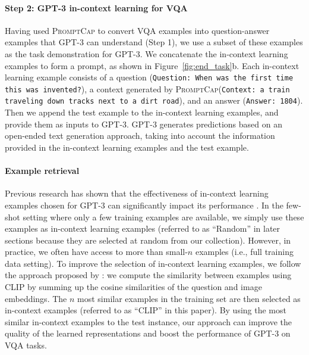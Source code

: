 \documentclass[10pt,twocolumn,letterpaper]{article}
\newcommand{\NAME}{\textsc{PromptCap}\xspace}
\begin{document}
\paragraph{Step 2: GPT-3 in-context learning for VQA}
Having used \NAME to convert VQA examples into question-answer examples that GPT-3 can understand (Step 1), 
we use a subset of these examples as the task demonstration for GPT-3. We concatenate the in-context learning examples to form a prompt, as shown in Figure~\ref{fig:end_task}b. Each in-context learning example consists of a question (\texttt{Question: When was the first time this was invented?}), a context generated by \NAME (\texttt{Context: a train traveling down tracks next to a dirt road}), and an answer (\texttt{Answer: 1804}). Then we append the test example to the in-context learning examples, and provide them as inputs to GPT-3. GPT-3 generates predictions based on an open-ended text generation approach, taking into account the information provided in the in-context learning examples and the test example.

\vspace{-0.1in}
\paragraph{Example retrieval}
\label{sec:icl:retrieval}
Previous research has shown that the effectiveness of in-context learning examples chosen for GPT-3 can significantly impact its performance \cite{liu-etal-2022-makes}. In the few-shot setting where only a few training examples are available, we simply use these examples as in-context learning examples (referred to as ``Random'' in later sections because they are selected at random from our collection). 
However, in practice, we often have access to more than small-$n$ examples (i.e., full training data setting). To improve the selection of in-context learning examples, we follow the approach proposed by \cite{yang2022empirical}:  we compute the similarity between examples using CLIP \cite{radford2021learning} by summing up the cosine similarities of the question and image embeddings. The $n$ most similar examples in the training set are then selected as in-context examples (referred to as ``CLIP'' in this paper). By using the most similar in-context examples to the test instance, our approach can improve the quality of the learned representations and boost the performance of GPT-3 on VQA tasks.
\end{document}
